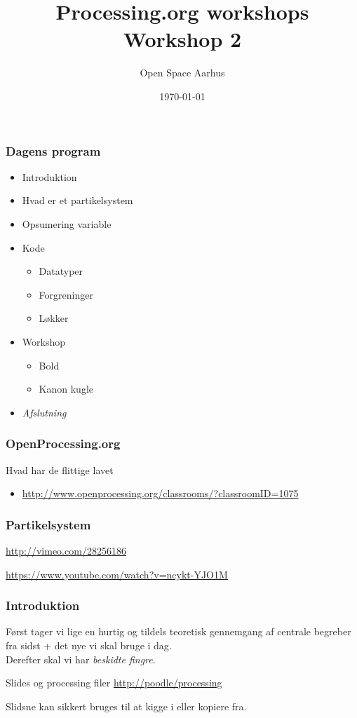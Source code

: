 \documentclass{beamer}
\title{Processing.org workshops\\Workshop 2}
\author{Open Space Aarhus}
\date{\today}
\institute[Bryggervej 30]{Bryggervej 30, 8240 Århus N}
\begin{document}
\begin{frame}[label=titlepage]
  \titlepage
\end{frame}

\begin{frame}
  \frametitle{Dagens program}
  \begin{itemize}
  \item Introduktion
  \item Hvad er et partikelsystem
  \item Opsumering variable
  \item Kode
    \begin{itemize}
    \item Datatyper
    \item Forgreninger
    \item Løkker
    \end{itemize}

  \item Workshop
    \begin{itemize}
    \item Bold
    \item Kanon kugle
    \end{itemize}

  \item \emph{Afslutning}
    
  \end{itemize}						
\end{frame}


\begin{frame}
  \frametitle{OpenProcessing.org}
  \begin{block}{Hvad har de flittige lavet}
    \begin{itemize}
    \item \url{http://www.openprocessing.org/classrooms/?classroomID=1075}
    \end{itemize}
  \end{block}
\end{frame}



\begin{frame}
  \frametitle{Partikelsystem}

  \url{http://vimeo.com/28256186}  

  \url{https://www.youtube.com/watch?v=ncykt-YJO1M}
\end{frame}


\begin{frame}
  \frametitle{Introduktion}
  
  Først tager vi lige en hurtig og tildels teoretisk gennemgang af
  centrale begreber fra sidst + det nye vi skal bruge i dag. \\
  \vspace{1cm}
  Derefter skal vi har \emph{beskidte fingre}.

  \begin{block}{Slides og processing filer}
    \url{http://poodle/processing}   
  \end{block}
  {\tiny Slidsne kan sikkert bruges til at kigge i eller kopiere fra.}
\end{frame}
\end{document}
